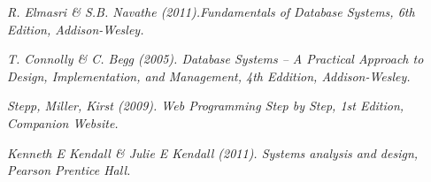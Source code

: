 \documentclass[12pt,a4paper]{report}
\begin{document}
\begin{thebibliography}{80}
\textit{R. Elmasri \& S.B. Navathe (2011).Fundamentals of Database Systems, 6th Edition, Addison-Wesley.}

\textit{T. Connolly \& C. Begg (2005). Database Systems – A Practical Approach to Design, Implementation, and Management, 4th Eddition, Addison-Wesley.}

\textit{Stepp, Miller, Kirst (2009). Web Programming Step by Step, 1st Edition, Companion Website.}


\textit{Kenneth E Kendall \& Julie E Kendall (2011). Systems analysis and design, Pearson Prentice Hall.}


\end{thebibliography}
\end{document}
